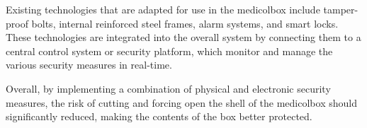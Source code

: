 \documentclass[../main.tex]{subfiles}
\begin{document}
Existing technologies that are adapted for use in the \gls{medicolbox}
include tamper-proof bolts, internal reinforced steel frames,
alarm systems, and smart locks.
These technologies are integrated into the overall system
by connecting them to a central control system or security platform,
which monitor and manage the various security measures in real-time.

Overall, by implementing a combination of
physical and electronic security measures,
the risk of cutting and forcing open the shell of the \gls{medicolbox}
should significantly reduced,
making the contents of the box better protected.
\end{document}
